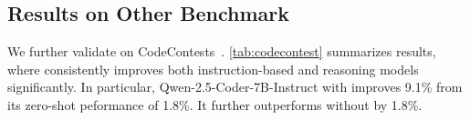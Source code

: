 \begin{table}[!t]
\centering
{}
\caption{\textbf{Performance comparison on CodeContests}. 
Bold text denotes the best performance of the same model. 
"Qwen-Coder" is short for "Qwen2.5-Coder-Instruct", 
"R1-Distill" is short for "DeepSeek-R1-Distill-Qwen". 
\textit{\frameworkname consistently improves model performance on benchmark beyond LiveCodeBench.}}
\label{tab:codecontest}
\vspace{-5mm}
\end{table}


\subsection{Results on Other Benchmark}
\label{sec:exp_other_benchmark}


We further validate \frameworkname on CodeContests~\citep{li2022competition}. \cref{tab:codecontest} summarizes results, where \frameworkname consistently improves both instruction-based and reasoning models significantly. In particular, Qwen-2.5-Coder-7B-Instruct with \frameworkname improves 9.1\% from its zero-shot peformance of 1.8\%. It further outperforms \fouromini without \frameworkname by 1.8\%.


